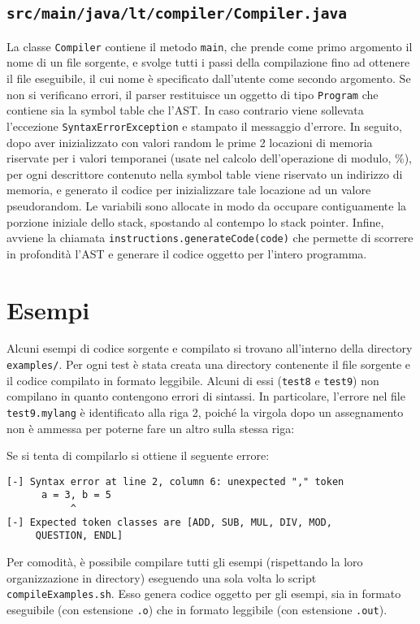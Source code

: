 \documentclass[10pt,a4paper]{article}
\begin{document}
\subsection{\texttt{src/main/java/lt/compiler/Compiler.java}}
La classe \texttt{Compiler} contiene il metodo \texttt{main}, che prende come primo argomento il nome di un file sorgente, e svolge tutti i passi della compilazione fino ad ottenere il file eseguibile, il cui nome è specificato dall'utente come secondo argomento.
Se non si verificano errori, il parser restituisce un oggetto di tipo \texttt{Program} che contiene sia la symbol table che l'AST.
In caso contrario viene sollevata l'eccezione \texttt{SyntaxErrorException} e stampato il messaggio d'errore.
In seguito, dopo aver inizializzato con valori random le prime 2 locazioni di memoria riservate per i valori temporanei (usate nel calcolo dell'operazione di modulo, $\%$), per ogni descrittore contenuto nella symbol table viene riservato un indirizzo di memoria, e generato il codice per inizializzare tale locazione ad un valore pseudorandom.
Le variabili sono allocate in modo da occupare contiguamente la porzione iniziale dello stack, spostando al contempo lo stack pointer.
Infine, avviene la chiamata \texttt{instructions.generateCode(code)} che permette di scorrere in profondità l'AST e generare il codice oggetto per l'intero programma.

\section{Esempi} \label{examples}

Alcuni esempi di codice sorgente e compilato si trovano all'interno della directory \texttt{examples/}.
Per ogni test è stata creata una directory contenente il file sorgente e il codice compilato in formato leggibile.
Alcuni di essi (\texttt{test8} e \texttt{test9}) non compilano in quanto contengono errori di sintassi.
In particolare, l'errore nel file \texttt{test9.mylang} è identificato alla riga 2, poiché la virgola dopo un assegnamento non è ammessa per poterne fare un altro sulla stessa riga:

\lstset{numbers=left, numberstyle=\small, numbersep=8pt, frame=leftline, xleftmargin=20pt}
\lstset{basicstyle=\ttfamily, breaklines=true, showlines=true}


Se si tenta di compilarlo si ottiene il seguente errore:\vspace{1pt}
\begin{verbatim}
[-] Syntax error at line 2, column 6: unexpected "," token
      a = 3, b = 5
           ^
[-] Expected token classes are [ADD, SUB, MUL, DIV, MOD,
     QUESTION, ENDL]
\end{verbatim}
\vspace{4pt}

Per comodità, è possibile compilare tutti gli esempi (rispettando la loro organizzazione in directory) eseguendo una sola volta lo script \texttt{compileExamples.sh}.
Esso genera codice oggetto per gli esempi, sia in formato eseguibile (con estensione \texttt{.o}) che in formato leggibile (con estensione \texttt{.out}).
\end{document}
